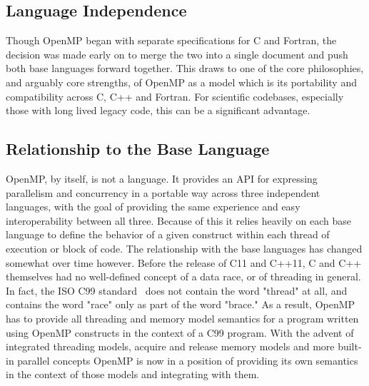\subsection{Language Independence}
\label{sub:language_independence}

Though OpenMP began with separate specifications for C and Fortran, the decision
was made early on to merge the two into a single document and push both base
languages forward together.  This draws to one of the core philosophies, and
arguably core strengths, of OpenMP as a model which is its portability and
compatibility across C, C++ and Fortran.  For scientific codebases, especially
those with long lived legacy code, this can be a significant advantage.  


\subsection{Relationship to the Base Language}
\label{sub:relationship_to_the_base_language}

OpenMP, by itself, is not a language.  It provides an API for expressing
parallelism and concurrency in a portable way across three independent
languages, with the goal of providing the same experience and easy
interoperability between all three.  Because of this it relies heavily on each
base language to define the behavior of a given construct within each thread of
execution or block of code.  The relationship with the base languages has
changed somewhat over time however.  Before the release of C11 and C++11, C and
C++ themselves had no well-defined concept of a data race, or of threading in
general.  In fact, the ISO C99 standard~\cite{c99} does not contain the word
"thread" at all, and contains the word "race" only as part of the word "brace."
As a result, OpenMP has to provide all threading and memory model semantics for
a program written using OpenMP constructs in the context of a C99 program.  With
the advent of integrated threading models, acquire and release memory models and
more built-in parallel concepts OpenMP is now in a position of providing its own
semantics in the context of those models and integrating with them.


